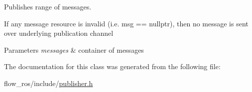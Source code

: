 Publishes range of messages. 

If any message resource is invalid (i.\+e. {\ttfamily msg == nullptr}), then no message is sent over underlying publication channel


\begin{DoxyParams}{Parameters}
{\em messages} & container of messages \\
\hline
\end{DoxyParams}


The documentation for this class was generated from the following file\+:\begin{DoxyCompactItemize}
\item 
flow\+\_\+ros/include/\hyperlink{publisher_8h}{publisher.\+h}\end{DoxyCompactItemize}
